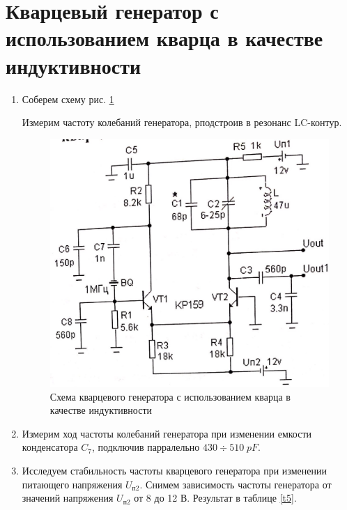 \documentclass[a4paper]{article}
\begin{document}
\section{Кварцевый генератор с использованием кварца в качестве индуктивности}

\begin{enumerate}
    \item Соберем схему рис. \ref{scheme_3}
    
    Измерим частоту колебаний генератора, рподстроив в резонанс LC-контур. 
    \begin{center}
    \end{center}

    \begin{figure}[H]
        \begin{center}
            \includegraphics[scale = 0.2]{scheme_3.jpg}
            \caption{Схема кварцевого генератора с использованием кварца в качестве индуктивности}
            \label{scheme_3}
        \end{center}
    \end{figure}

    \item Измерим ход частоты колебаний генератора при изменении емкости конденсатора $C_7$, подключив парралельно $430 \div 510\; pF$.
    \begin{center}
    \end{center}
    \item Исследуем стабильность частоты кварцевого генератора при изменении питающего напряжения $U_{п2}$. Снимем зависимость частоты генератора от значений напряжения 
    $U_{п2}$ от 8 до 12 В. Результат в таблице \ref{t5}.


\end{enumerate}
\end{document}
